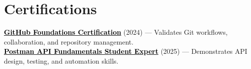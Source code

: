 \documentclass[a4paper,11pt]{article}
\begin{document}
\section{Certifications}
 \begin{itemize}[leftmargin=0.15in, label={}]
    \small{\item{
    \href{https://www.credly.com/badges/d5c30c19-02db-4c5f-9bc9-4bd0f4b6a89e/public_url}{\textcolor{black}{\textbf{GitHub Foundations Certification}}} (2024) — Validates Git workflows, collaboration, and repository management. \\
    \href{https://badges.parchment.com/public/assertions/ZF0yx-i3T1CvXYwDLEUneA?identity__email=sakib.sadman.badhon\%40g.bracu.ac.bd}{\textcolor{black}{\textbf{Postman API Fundamentals Student Expert}}} (2025) — Demonstrates API design, testing, and automation skills. \\
    }}
 \end{itemize}
\end{document}
